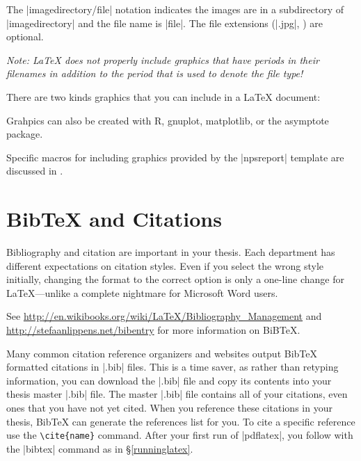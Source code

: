 The |imagedirectory/file| notation indicates the images are in a subdirectory of |imagedirectory| and the file name is |file|.  The file extensions (|.jpg|, \etc) are optional. 

\emph{Note: \LaTeX{} does not properly include graphics that have
  periods in their filenames in addition to the period that is used to
  denote the file type!} 

There are two kinds graphics that you can include in a \LaTeX{}
document: 

Grahpics can also be created with R, gnuplot, matplotlib, or the
asymptote package.

Specific macros for including graphics provided by the |npsreport|
template are discussed in .

\section{Bib\TeX{} and Citations}
Bibliography and citation are important in your thesis.  Each department has different expectations
on citation styles.  Even if you select the wrong style initially, changing the format to the correct
option is only a one-line change for \LaTeX{}---unlike a complete nightmare for Microsoft Word users.

See \url{http://en.wikibooks.org/wiki/LaTeX/Bibliography_Management} and
 \\ \url{http://stefaanlippens.net/bibentry} for more information on BiB\TeX.
 
Many common citation reference organizers and websites output Bib\TeX{} formatted citations in |.bib| files.  This is a time saver,
as rather than retyping information, you can download the |.bib| file and copy its contents into your thesis master |.bib| file.
The master |.bib| file contains all of your citations, even ones that you have not yet cited.  When you reference these citations in your thesis, Bib\TeX{} can 
generate the references list for you.  To cite a specific reference use the \verb|\cite{name}| command.  After your first run of |pdflatex|, you follow with the |bibtex| command 
as in \S\ref{runninglatex}. 

